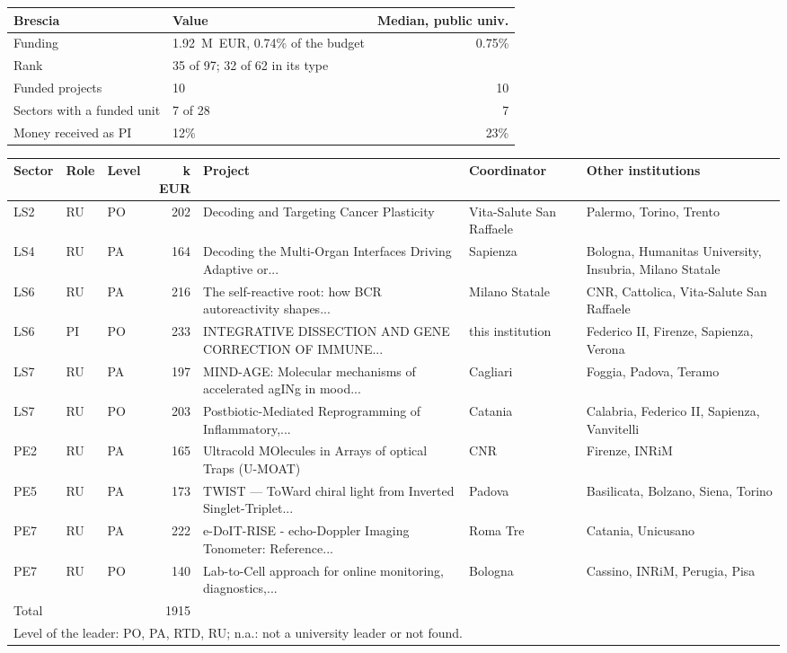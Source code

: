 \documentclass[11pt,a4paper]{article}
\begin{document}
\begin{table}[H]
\centering
\begin{tabular}{llr}
\toprule
Brescia & Value & Median, public univ. \\
\midrule
Funding & 1.92~M~EUR, 0.74\% of the budget & 0.75\% \\
Rank & 35 of 97; 32 of 62 in its type &  \\
Funded projects & 10 & 10 \\
Sectors with a funded unit & 7 of 28 & 7 \\
Money received as PI & 12\% & 23\% \\
\bottomrule
\end{tabular}
\end{table}
{\footnotesize
\begin{longtable}{lllrp{4.2cm}p{2cm}p{3.2cm}}
\toprule
Sector & Role & Level & k EUR & Project & Coordinator & Other institutions \\
\midrule
\endhead
LS2 & RU & PO & 202 & Decoding and Targeting Cancer Plasticity & Vita-Salute San Raffaele & Palermo, Torino, Trento \\
LS4 & RU & PA & 164 & Decoding the Multi-Organ Interfaces Driving Adaptive or... & Sapienza & Bologna, Humanitas University, Insubria, Milano Statale \\
LS6 & RU & PA & 216 & The self-reactive root: how BCR autoreactivity shapes... & Milano Statale & CNR, Cattolica, Vita-Salute San Raffaele \\
LS6 & PI & PO & 233 & INTEGRATIVE DISSECTION AND GENE CORRECTION OF IMMUNE... & this institution & Federico II, Firenze, Sapienza, Verona \\
LS7 & RU & PA & 197 & MIND-AGE: Molecular mechanisms of accelerated agINg in mood... & Cagliari & Foggia, Padova, Teramo \\
LS7 & RU & PO & 203 & Postbiotic-Mediated Reprogramming of Inflammatory,... & Catania & Calabria, Federico II, Sapienza, Vanvitelli \\
PE2 & RU & PA & 165 & Ultracold MOlecules in Arrays of optical Traps (U-MOAT) & CNR & Firenze, INRiM \\
PE5 & RU & PA & 173 & TWIST — ToWard chiral light from Inverted Singlet-Triplet... & Padova & Basilicata, Bolzano, Siena, Torino \\
PE7 & RU & PA & 222 & e-DoIT-RISE - echo-Doppler Imaging Tonometer: Reference... & Roma Tre & Catania, Unicusano \\
PE7 & RU & PO & 140 & Lab-to-Cell approach for online monitoring, diagnostics,... & Bologna & Cassino, INRiM, Perugia, Pisa \\
\midrule
Total &  &  & 1915 &  &  &  \\
\bottomrule
\multicolumn{7}{l}{\footnotesize Level of the leader: PO, PA, RTD, RU; n.a.: not a university leader or not found.} \\
\end{longtable}
}
\end{document}
